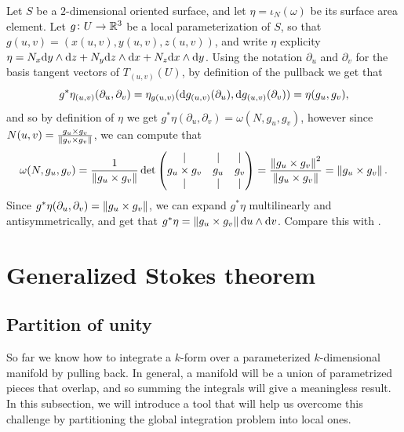 \documentclass[11pt,a4paper]{article}
\begin{document}
\begin{example}
  Let $S$ be a $2$-dimensional oriented surface,
  and let $\eta = \iota_N(\omega)$ be its surface area element.
  Let $g \colon U \to \mathbb{R}^3$ be a local parameterization of $S$,
  so that $g(u,v) = (x(u,v),y(u,v),z(u,v))$,
  and write $\eta$ explicity $\eta = N_x \dy \wedge \dz + N_y \dz \wedge \dx + N_z \dx \wedge \dy$.
  Using the notation $\partial_u$ and $\partial_v$ for the basis tangent vectors
  of $T_{(u,v)}(U)$, by definition of the pullback we get that
  \[
    g^*\eta_{(u,v)}(\partial_u,\partial_v) =
    \eta_{g(u,v)}(\mathrm{d} g_{(u,v)}(\partial_u),\mathrm{d} g_{(u,v)}(\partial_v)) =
    \eta(g_u,g_v),
  \]
  and so by definition of $\eta$ we get
  $g^*\eta(\partial_u,\partial_v) = \omega(N,g_u,g_v)$,
  however since $N(u,v) = \frac{g_u \times g_v}{\left\lVert g_v \times g_v\right\rVert}$,
  we can compute that
  \[
    \omega(N,g_u,g_v) =
    \frac{1}{\left\lVert g_u \times g_v\right\rVert}
    \det
    \begin{pmatrix}
      \vert & \vert & \vert \\
      g_u \times g_v & g_u & g_v \\
      \vert & \vert & \vert
    \end{pmatrix} =
    \frac{\left\lVert g_u \times g_v\right\rVert^2}{\left\lVert g_u \times g_v\right\rVert} =
    \left\lVert g_u \times g_v\right\rVert.
  \]
  Since $g^*\eta(\partial_u,\partial_v) = \left\lVert g_u \times g_v\right\rVert$,
  we can expand $g^*\eta$ multilinearly and antisymmetrically,
  and get that $g^*\eta = \left\lVert g_u \times g_v\right\rVert \mathrm{d} u \wedge \mathrm{d} v$.
  Compare this with .
\end{example}

\newpage

\section{Generalized Stokes theorem}

\subsection{Partition of unity}
So far we know how to integrate a $k$-form over a parameterized
$k$-dimensional manifold by pulling back.
In general, a manifold will be a union of parametrized pieces that overlap,
and so summing the integrals will give a meaningless result.
In this subsection, we will introduce a tool that will help us
overcome this challenge by partitioning the global integration problem
into local ones.
\end{document}
